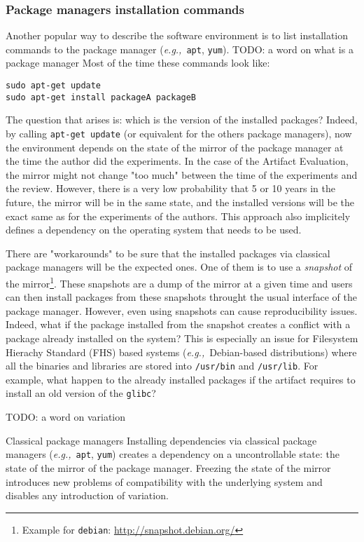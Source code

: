 \documentclass[sigconf,natbib=false]{acmart}
\newcommand{\eg}{\emph{e.g.,}}
\newcommand{\aeval}{Artifact Evaluation}
\newcommand{\todo}[1]{{\color{red}TODO: #1}}
\begin{document}
\subsubsection{Package managers installation commands}

Another popular way to describe the software environment is to list installation commands to the package manager (\eg\ \texttt{apt}, \texttt{yum}).
\todo{a word on what is a package manager}
Most of the time these commands look like:

\begin{verbatim}
sudo apt-get update
sudo apt-get install packageA packageB
\end{verbatim}

The question that arises is: which is the version of the installed packages?
Indeed, by calling \texttt{apt-get update} (or equivalent for the others package managers), now the environment depends on the state of the mirror of the package manager at the time the author did the experiments.
In the case of the \aeval, the mirror might not change "too much" between the time of the experiments and the review.
However, there is a very low probability that 5 or 10 years in the future, the mirror will be in the same state, and the installed versions will be the exact same as for the experiments of the authors.
This approach also implicitely defines a dependency on the operating system that needs to be used.

There are "workarounds" to be sure that the installed packages via classical package managers will be the expected ones. 
One of them is to use a \emph{snapshot} of the mirror\footnote{Example for \texttt{debian}: \url{http://snapshot.debian.org/}}.
These snapshots are a dump of the mirror at a given time and users can then install packages from these snapshots throught the usual interface of the package manager.
However, even using snapshots can cause reproducibility issues.
Indeed, what if the package installed from the snapshot creates a conflict with a package already installed on the system?
This is especially an issue for Filesystem Hierachy Standard (FHS) based systems (\eg\ Debian-based distributions) where all the binaries and libraries are stored into \texttt{/usr/bin} and \texttt{/usr/lib}.
For example, what happen to the already installed packages if the artifact requires to install an old version of the \texttt{glibc}? 

\todo{a word on variation}


\begin{lesson}{Classical package managers}{}
  Installing dependencies via classical package managers (\eg\ \texttt{apt}, \texttt{yum}) creates a dependency on a uncontrollable state: the state of the mirror of the package manager.
  Freezing the state of the mirror introduces new problems of compatibility with the underlying system and disables any introduction of variation.
\end{lesson}
\end{document}
